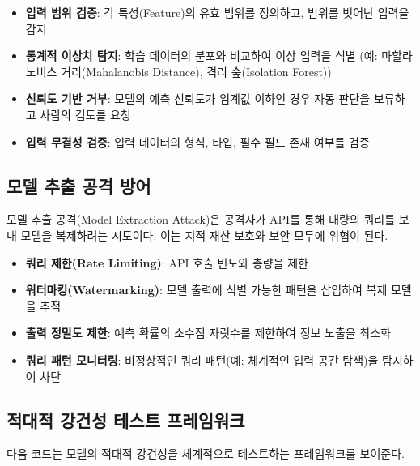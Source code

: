 \begin{itemize}
  \item \textbf{입력 범위 검증}: 각 특성(Feature)의 유효 범위를 정의하고, 범위를 벗어난 입력을 감지
  \item \textbf{통계적 이상치 탐지}: 학습 데이터의 분포와 비교하여 이상 입력을 식별 (예: 마할라노비스 거리(Mahalanobis Distance), 격리 숲(Isolation Forest))
  \item \textbf{신뢰도 기반 거부}: 모델의 예측 신뢰도가 임계값 이하인 경우 자동 판단을 보류하고 사람의 검토를 요청
  \item \textbf{입력 무결성 검증}: 입력 데이터의 형식, 타입, 필수 필드 존재 여부를 검증
\end{itemize}

\subsection{모델 추출 공격 방어}
\label{sec:10.4.3}

모델 추출 공격(Model Extraction Attack)은 공격자가 API를 통해 대량의 쿼리를 보내 모델을 복제하려는 시도이다. 이는 지적 재산 보호와 보안 모두에 위협이 된다.

\begin{itemize}
  \item \textbf{쿼리 제한(Rate Limiting)}: API 호출 빈도와 총량을 제한
  \item \textbf{워터마킹(Watermarking)}: 모델 출력에 식별 가능한 패턴을 삽입하여 복제 모델을 추적
  \item \textbf{출력 정밀도 제한}: 예측 확률의 소수점 자릿수를 제한하여 정보 노출을 최소화
  \item \textbf{쿼리 패턴 모니터링}: 비정상적인 쿼리 패턴(예: 체계적인 입력 공간 탐색)을 탐지하여 차단
\end{itemize}

\subsection{적대적 강건성 테스트 프레임워크}
\label{sec:10.4.4}

다음 코드는 모델의 적대적 강건성을 체계적으로 테스트하는 프레임워크를 보여준다.


